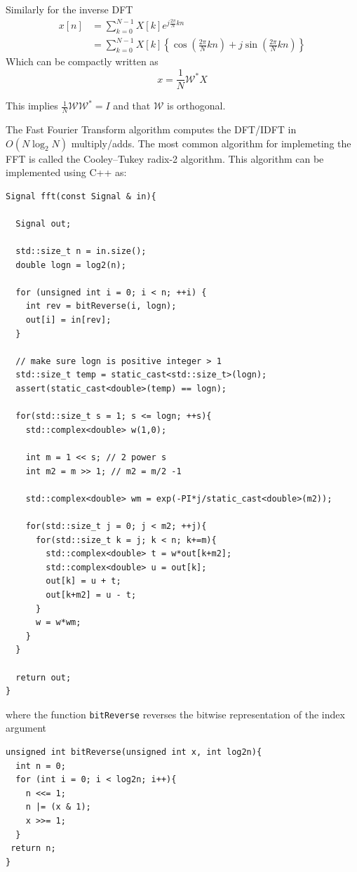 Similarly for the inverse DFT
\begin{align*}
  x[n] &= \sum_{k = 0}^{N-1}  X[k] e^{j \frac{2\pi}{N}k n}\\
  &= \sum_{k = 0}^{N-1}  X[k] \left\{ \cos\left( \frac{2\pi}{N}k n\right) + j \sin\left(\frac{2\pi}{N}k n \right)\right\}
\end{align*}
Which can be compactly written as
\[
x = \frac{1}{N} \mathcal{W}^{*} X
\]

This implies $\frac{1}{N}\mathcal{W}\mathcal{W}^* = I$ and that $\mathcal{W}$ is orthogonal.

The Fast Fourier Transform algorithm computes the DFT/IDFT in $O(N\log_2 N)$ multiply/adds. The most common algorithm for implemeting the FFT is called the Cooley–Tukey radix-2 algorithm. This algorithm can be implemented using C++ as:

\begin{verbatim}
Signal fft(const Signal & in){

  Signal out;

  std::size_t n = in.size();
  double logn = log2(n);

  for (unsigned int i = 0; i < n; ++i) {
    int rev = bitReverse(i, logn);
    out[i] = in[rev];
  }

  // make sure logn is positive integer > 1
  std::size_t temp = static_cast<std::size_t>(logn);
  assert(static_cast<double>(temp) == logn);

  for(std::size_t s = 1; s <= logn; ++s){
    std::complex<double> w(1,0);

    int m = 1 << s; // 2 power s
    int m2 = m >> 1; // m2 = m/2 -1

    std::complex<double> wm = exp(-PI*j/static_cast<double>(m2));

    for(std::size_t j = 0; j < m2; ++j){
      for(std::size_t k = j; k < n; k+=m){
        std::complex<double> t = w*out[k+m2];
        std::complex<double> u = out[k];
        out[k] = u + t;
        out[k+m2] = u - t;
      }
      w = w*wm;
    }
  }

  return out;
}
\end{verbatim}

where the function \texttt{bitReverse} reverses the bitwise representation of the index argument

\begin{verbatim}
unsigned int bitReverse(unsigned int x, int log2n){
  int n = 0;
  for (int i = 0; i < log2n; i++){
    n <<= 1;
    n |= (x & 1);
    x >>= 1;
  }
 return n;
}
\end{verbatim}

